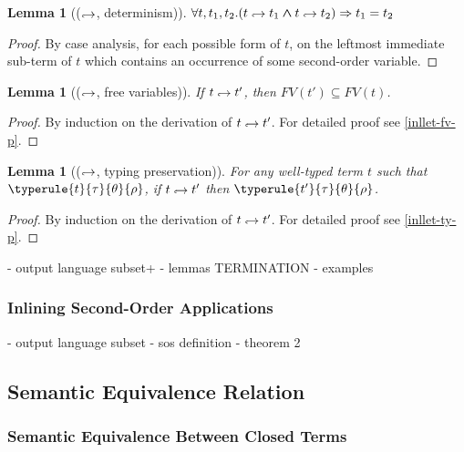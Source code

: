 \documentclass[a4paper,11pt,oneside]{article}
\theoremstyle{plain}
\newtheorem{lemma}[definition]{Lemma}
\newcommand{\bwedge}{\boldsymbol{\wedge}}
\newcommand{\hookdownarrow}{\mathrel{\rotatebox[origin=c]{180}{$\hookleftarrow$}}}
\newcommand{\inlletarr}{\hookdownarrow}
\newcommand{\inllet}[2]{#1 \hookdownarrow #2}
\begin{document}
\begin{lemma}[($\inlletarr$, determinism)] 
$\forall t,t_1,t_2.(\inllet{t}{t_1}\bwedge\inllet{t}{t_2})\Rightarrow t_1=t_2$
\end{lemma}

\begin{proof}
 By case analysis, for each possible form of $t$, on the leftmost immediate sub-term of $t$ which contains an occurrence of some second-order variable.
\end{proof}

\begin{lemma}[($\inlletarr$, free variables)] 
 If $\inllet{t}{t'}$, then $FV(t') \subseteq FV(t)$.
 \label{inllet-fv-l}
\end{lemma}

\begin{proof}
 By induction on the derivation of $\inllet{t}{t'}$. For detailed proof see
 \ref{inllet-fv-p}.
 \end{proof}

\begin{lemma}[($\inlletarr$, typing preservation)] For any well-typed term $t$
 such that \mbox{$\typerule{t}{\tau}{\theta}{\rho}$}, if $\inllet{t}{t'}$
 then $\typerule{t'}{\tau}{\theta}{\rho}$.
 \label{inllet-ty-l}
\end{lemma}

\begin{proof} By induction on the derivation of $\inllet{t}{t'}$. For detailed proof see \ref{inllet-ty-p}.
\end{proof}
- output language subset+
- lemmas TERMINATION
- examples

\subsubsection*{Inlining Second-Order Applications}

- output language subset
- sos definition
- theorem 2	
	
\subsection{Semantic Equivalence Relation}

\subsubsection*{Semantic Equivalence Between Closed Terms}
\end{document}
